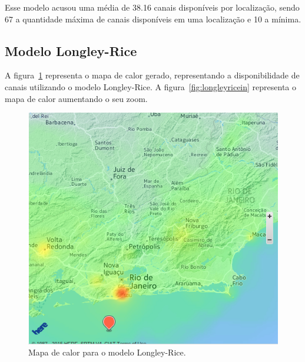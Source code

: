 \FloatBarrier

Esse modelo acusou uma média de 38.16 canais disponíveis por localização, sendo 67 a quantidade máxima de canais disponíveis em uma localização e 10 a mínima.

\subsection{Modelo Longley-Rice}

A figura~\ref{fig:longleyriceout} representa o mapa de calor gerado, representando a disponibilidade de canais utilizando o modelo Longley-Rice. A figura~\ref{fig:longleyricein} representa o mapa de calor aumentando o seu zoom.

\begin{figure}[htb]
\centering
\includegraphics[width=1.0\textwidth]{figs/longleyriceout}
\caption[Mapa de calor para o modelo Longley-Rice.]
{Mapa de calor para o modelo Longley-Rice.}
\label{fig:longleyriceout}
\end{figure} 

